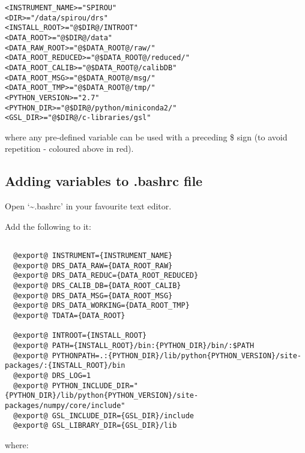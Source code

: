 \begin{lstlisting}[style=text]
<INSTRUMENT_NAME>="SPIROU"
<DIR>="/data/spirou/drs"
<INSTALL_ROOT>="@$DIR@/INTROOT"
<DATA_ROOT>="@$DIR@/data"
<DATA_RAW_ROOT>="@$DATA_ROOT@/raw/"
<DATA_ROOT_REDUCED>="@$DATA_ROOT@/reduced/"
<DATA_ROOT_CALIB>="@$DATA_ROOT@/calibDB"
<DATA_ROOT_MSG>="@$DATA_ROOT@/msg/"
<DATA_ROOT_TMP>="@$DATA_ROOT@/tmp/"
<PYTHON_VERSION>="2.7"
<PYTHON_DIR>="@$DIR@/python/miniconda2/"
<GSL_DIR>="@$DIR@/c-libraries/gsl"
\end{lstlisting}

\noindent where any pre-defined variable can be used with a preceding \$ sign (to avoid repetition - coloured above in red).


\subsection{Adding variables to .bashrc file}
\label{section:using_bashrc}

Open `\~\/.bashrc' in your favourite text editor.

Add the following to it:
\begin{lstlisting}[style=text]
    
  @export@ INSTRUMENT={INSTRUMENT_NAME}
  @export@ DRS_DATA_RAW={DATA_ROOT_RAW}
  @export@ DRS_DATA_REDUC={DATA_ROOT_REDUCED}
  @export@ DRS_CALIB_DB={DATA_ROOT_CALIB}
  @export@ DRS_DATA_MSG={DATA_ROOT_MSG}
  @export@ DRS_DATA_WORKING={DATA_ROOT_TMP}
  @export@ TDATA={DATA_ROOT}

  @export@ INTROOT={INSTALL_ROOT}
  @export@ PATH={INSTALL_ROOT}/bin:{PYTHON_DIR}/bin/:$PATH
  @export@ PYTHONPATH=.:{PYTHON_DIR}/lib/python{PYTHON_VERSION}/site-packages/:{INSTALL_ROOT}/bin
  @export@ DRS_LOG=1
  @export@ PYTHON_INCLUDE_DIR="{PYTHON_DIR}/lib/python{PYTHON_VERSION}/site-packages/numpy/core/include"
  @export@ GSL_INCLUDE_DIR={GSL_DIR}/include
  @export@ GSL_LIBRARY_DIR={GSL_DIR}/lib

\end{lstlisting}

where:

